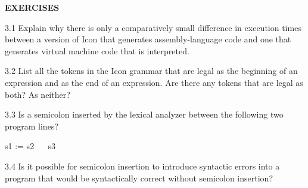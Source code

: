 {\sffamily\bfseries
EXERCISES}


3.1 Explain why there is only a comparatively small difference in
execution times between a version of Icon that generates
assembly-language code and one that generates virtual machine code
that is interpreted.

3.2 List all the tokens in the Icon grammar that are legal as the
beginning of an expression and as the end of an expression. Are there
any tokens that are legal as both? As neither?

3.3 Is a semicolon inserted by the lexical analyzer between the
following two program lines?

{\ttfamily
s1 := s2\newline
\ \ {\textbar}{\textbar} s3}

3.4 Is it possible for semicolon insertion to introduce syntactic
errors into a program that would be syntactically correct without
semicolon insertion?
